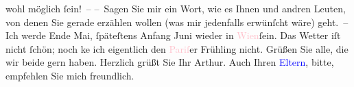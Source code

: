                     wohl möglich ſein! –\pend
           \pstart
           – Sagen Sie mir ein Wort, wie es Ihnen und andren Leuten, von denen Sie gerade
                    erzählen wollen (was mir jedenfalls erwünſcht wäre) geht. – Ich werde Ende
                        Mai, ſpäteſtens Anfang Juni wieder in \textcolor{pink}{Wien}{}\ledrightnote{\textcolor{pink}{Wien}}{ }ſein. Das Wetter iſt nicht ſchön; noch ke{\geminationn} ich eigentlich den \textcolor{pink}{Pariſ}{}\ledrightnote{\textcolor{pink}{Paris}}er Frühling nicht.\pend
           \pstart
           Grüßen Sie alle, die wir beide gern haben.\pend
           \pstart Herzlich grüßt Sie Ihr \spacefill\mbox{Arthur.}\pend{}\pstart
           \noindent{}Auch Ihren \textcolor{blue}{Eltern}{}, bitte, empfehlen Sie mich freundlich.\pend
           \endnumbering{}  
      